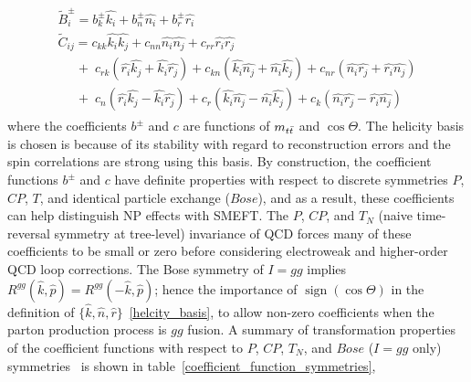 \begin{align}
\begin{array}{l}
\tilde{B}_i^\pm =  b_k^\pm \hat{k_i} + b_n^\pm \hat{n_i} + b_r^\pm \hat{r_i} \\
\tilde{C}_{ij}  =  c_{kk} \hat{k_i}\hat{k_j} + c_{nn} \hat{n_i}\hat{n_j} + c_{rr} \hat{r_i}\hat{r_j} \\ 
\;\;\;\;\; + \; c_{rk} (\hat{r_i}\hat{k_j} + \hat{k_i}\hat{r_j}) +  c_{kn} (\hat{k_i}\hat{n_j} + \hat{n_i}\hat{k_j})  +  c_{nr} (\hat{n_i}\hat{r_j} + \hat{r_i}\hat{n_j}) \\
\;\;\;\;\; + \; c_{n} (\hat{r_i}\hat{k_j} - \hat{k_i}\hat{r_j}) +  c_{r} (\hat{k_i}\hat{n_j} - \hat{n_i}\hat{k_j})  +  c_{k} (\hat{n_i}\hat{r_j} - \hat{r_i}\hat{n_j})
\end{array}
\label{spin_density_matrix_decomposition_expansion}
\end{align}
where the coefficients $b^\pm$ and $c$ are functions of $m_{t\bar{t}}$ and $\cos \Theta$.
The helicity basis is chosen is because of its stability with regard to reconstruction errors and the spin correlations are strong using this basis.
By construction, the coefficient functions $b^\pm$ and $c$ have definite properties with respect to discrete symmetries $P$, $CP$, $T$, and identical particle exchange ($Bose$), and as a result, these coefficients can help distinguish NP effects with SMEFT.
The $P$, $CP$, and $T_N$ (naive time-reversal symmetry at tree-level) invariance of QCD forces many of these coefficients to be small or zero before considering electroweak and higher-order QCD loop corrections.
The Bose symmetry of $I = gg$ implies $R^{gg}(\hat{k},\hat{p}) = R^{gg}(-\hat{k},\hat{p})$; hence the importance of $\operatorname{sign}(\cos \Theta)$ in the definition of $\{\hat{k},\hat{n},\hat{r}\}$~\ref{helcity_basis}, to allow non-zero coefficients when the parton production process is $gg$ fusion.
A summary of transformation properties of the coefficient functions with respect to $P$, $CP$, $T_N$, and $Bose$ ($I = gg$ only) symmetries~\cite{Bernreuther} is shown in table~\ref{coefficient_function_symmetries}, 
